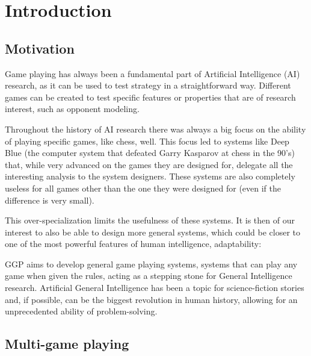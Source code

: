 
\chapter{Introduction}
\label{chapter:introduction}

\section{Motivation}

Game playing has always been a fundamental part of Artificial Intelligence (AI) research, as it can be used to test strategy in a straightforward way. Different games can be created to test specific features or properties that are of research interest, such as opponent modeling.

Throughout the history of AI research there was always a big focus on the ability of playing specific games, like chess, well. This focus led to systems like Deep Blue (the computer system that defeated Garry Kasparov at chess in the 90’s) that, while very advanced on the games they are designed for, delegate all the interesting analysis to the system designers. These systems are also completely useless for all games other than the one they were designed for (even if the difference is very small).

This over-specialization limits the usefulness of these systems. It is then of our interest to also be able to design more general systems, which could be closer to one of the most powerful features of human intelligence, adaptability:


\gls{GGP} aims to develop general game playing systems, systems that can play any game when given the rules, acting as a stepping stone for General Intelligence research. Artificial General Intelligence has been a topic for science-fiction stories and, if possible, can be the biggest revolution in human history, allowing for an unprecedented ability of problem-solving.

\section{Multi-game playing}


